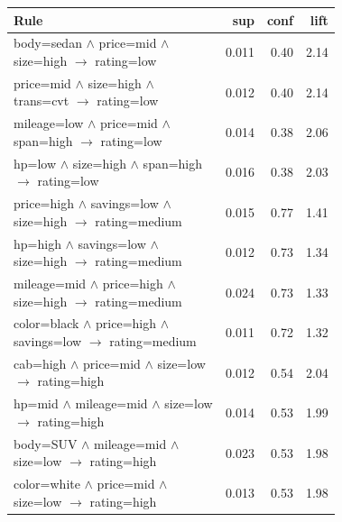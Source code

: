\begin{tabular}{@{}>{\raggedright\arraybackslash}p{0.72\linewidth}rrr@{}}
\toprule
Rule & sup & conf & lift \\
\midrule
body=sedan $\wedge$ price=mid $\wedge$ size=high $\rightarrow$ rating=low & 0.011 & 0.40 & 2.14 \\
price=mid $\wedge$ size=high $\wedge$ trans=cvt $\rightarrow$ rating=low & 0.012 & 0.40 & 2.14 \\
mileage=low $\wedge$ price=mid $\wedge$ span=high $\rightarrow$ rating=low & 0.014 & 0.38 & 2.06 \\
hp=low $\wedge$ size=high $\wedge$ span=high $\rightarrow$ rating=low & 0.016 & 0.38 & 2.03 \\
\midrule
price=high $\wedge$ savings=low $\wedge$ size=high $\rightarrow$ rating=medium & 0.015 & 0.77 & 1.41 \\
hp=high $\wedge$ savings=low $\wedge$ size=high $\rightarrow$ rating=medium & 0.012 & 0.73 & 1.34 \\
mileage=mid $\wedge$ price=high $\wedge$ size=high $\rightarrow$ rating=medium & 0.024 & 0.73 & 1.33 \\
color=black $\wedge$ price=high $\wedge$ savings=low $\rightarrow$ rating=medium & 0.011 & 0.72 & 1.32 \\
\midrule
cab=high $\wedge$ price=mid $\wedge$ size=low $\rightarrow$ rating=high & 0.012 & 0.54 & 2.04 \\
hp=mid $\wedge$ mileage=mid $\wedge$ size=low $\rightarrow$ rating=high & 0.014 & 0.53 & 1.99 \\
body=SUV $\wedge$ mileage=mid $\wedge$ size=low $\rightarrow$ rating=high & 0.023 & 0.53 & 1.98 \\
color=white $\wedge$ price=mid $\wedge$ size=low $\rightarrow$ rating=high & 0.013 & 0.53 & 1.98 \\
\bottomrule
\end{tabular}
